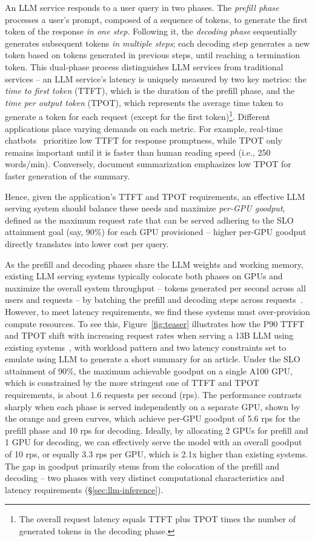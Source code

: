 An LLM service responds to a user query in two phases. The \emph{prefill phase} processes a user's prompt, composed of a sequence of tokens, to generate the first token of the response \emph{in one step}. Following it, the \emph{decoding phase} sequentially generates subsequent tokens \emph{in multiple steps}; each decoding step generates a new token based on tokens generated in previous steps, until reaching a termination token.
This dual-phase process distinguishes LLM services from traditional services
-- an LLM service's latency is uniquely measured by two key metrics: the \emph{time to first token} (TTFT), which is the duration of the prefill phase, and the \emph{time per output token} (TPOT), which represents the average time taken to generate a token for each request (except for the first token)\footnote{The overall request latency equals TTFT plus TPOT times the number of generated tokens in the decoding phase.}. 
Different applications place varying demands on each metric. For example, real-time chatbots~\cite{chatgpt} prioritize low TTFT for response promptness, while TPOT only remains important until it is faster than human reading speed (i.e., 250 words/min).
Conversely, document summarization emphasizes low TPOT for faster generation of the summary.

Hence, given the application's TTFT and TPOT requirements, an effective LLM serving system should balance these needs and maximize \emph{per-GPU goodput}, defined as the maximum request rate that can be served adhering to the SLO attainment goal (say, 90\%) for each GPU provisioned -- higher per-GPU goodput directly translates into lower cost per query.

As the prefill and decoding phases share the LLM weights and working memory,
existing LLM serving systems typically colocate both phases on GPUs and maximize the overall system throughput  -- tokens generated per second across all users and requests -- by batching the prefill and decoding steps across requests~\cite{yu2022orca,kwon2023efficient}. However, to meet latency requirements, we find these systems must over-provision compute resources. To see this, Figure~\ref{fig:teaser} illustrates how the P90 TTFT and TPOT shift with increasing request rates when serving a 13B LLM using existing systems~\cite{vllm}, with workload pattern and two latency constraints set to emulate using LLM to generate a short summary for an article. Under the SLO attainment of 90\%, the maximum achievable goodput on a single A100 GPU, which is constrained by the more stringent one of TTFT and TPOT requirements, is about 1.6 requests per second (rps). 
The performance contrasts sharply when each phase is served independently on a separate GPU, shown by the orange and green curves, which achieve per-GPU goodput of 5.6 rps for the prefill phase and 10 rps for decoding. Ideally, by allocating 2 GPUs for prefill and 1 GPU for decoding, we can effectively serve the model with an overall goodput of 10 rps, or equally 3.3 rps per GPU, which is 2.1x higher than existing systems.
The gap in goodput primarily stems from the colocation of the prefill and decoding  -- two phases with very distinct computational characteristics and latency requirements (\S\ref{sec:llm-inference}).


